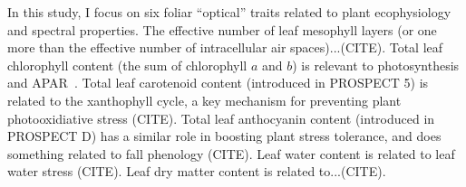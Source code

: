 In this study, I focus on six foliar ``optical'' traits related to plant ecophysiology and spectral properties.
The effective number of leaf mesophyll layers (or one more than the effective number of intracellular air spaces)...(CITE).
% 
% 
Total leaf chlorophyll content (the sum of chlorophyll $a$ and $b$) is relevant to photosynthesis and APAR~\cite{croft_2017_chlorophyll}.
Total leaf carotenoid content (introduced in PROSPECT 5) is related to the xanthophyll cycle, a key mechanism for preventing plant photooxidiative stress (CITE).
% 
% 
Total leaf anthocyanin content (introduced in PROSPECT D) has a similar role in boosting plant stress tolerance, and does something related to fall phenology (CITE).
% 
% 
Leaf water content is related to leaf water stress (CITE).
Leaf dry matter content is related to...(CITE).

